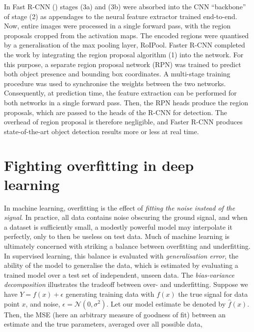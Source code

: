 In Fast R-CNN (\cite{girshick2015fast}) stages (3a) and (3b) were absorbed into the CNN ``backbone'' of stage (2) as appendages to the neural feature extractor trained end-to-end. Now, entire images were processed in a single forward pass, with the region proposals cropped from the activation maps. The encoded regions were quantised by a generalisation of the max pooling layer, RoIPool. Faster R-CNN \cite{ren2015faster} completed the work by integrating the region proposal algorithm (1) into the network. For this purpose, a separate region proposal network (RPN) was trained to predict both object presence and bounding box coordinates. A multi-stage training procedure was used to synchronise the weights between the two networks. Consequently, at prediction time, the feature extraction can be performed for both networks in a single forward pass. Then, the RPN heads produce the region proposals, which are passed to the heads of the R-CNN for detection. The overhead of region proposal is therefore negligible, and Faster R-CNN produces state-of-the-art object detection results more or less at real time.


\section{Fighting overfitting in deep learning}

In machine learning, overfitting is the effect of \emph{fitting the noise instead of the signal}. In practice, all data contains noise obscuring the ground signal, and when a dataset is sufficiently small, a modestly powerful model may interpolate it perfectly, only to then be useless on test data. Much of machine learning is ultimately concerned with striking a balance between overfitting and underfitting. In supervised learning, this balance is evaluated with \emph{generalisation error}, the ability of the model to generalise the data, which is estimated by evaluating a trained model over a test set of independent, unseen data. The \emph{bias-variance decomposition} illustrates the tradeoff between over- and underfitting. Suppose we have $Y = f(x) + \epsilon$ generating training data with $f(x)$ the true signal for data point $x$, and noise, $\epsilon = \mathcal{N}(0, \sigma^2)$. Let our model estimate be denoted by $\hat{f}(x)$. Then, the MSE (here an arbitrary measure of goodness of fit) between an estimate and the true parameters, averaged over all possible data,

